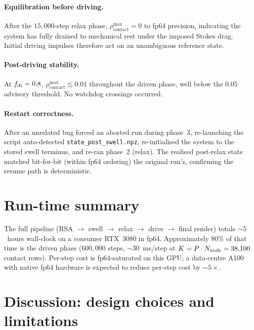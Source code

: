 \documentclass[aps,pre,twocolumn,floatfix,longbibliography]{revtex4-2}
\newcommand{\rhoc}{\rho_{\mathrm{contact}}}
\begin{document}
\paragraph*{Equilibration before driving.}
After the $15{,}000$-step relax phase, $\rhoc^{\max} = 0$ to fp64
precision, indicating the system has fully drained to mechanical rest
under the imposed Stokes drag.  Initial driving impulses therefore
act on an unambiguous reference state.

\paragraph*{Post-driving stability.}
At $f_{\rm dt} = 0.8$, $\rhoc^{\max} \lesssim 0.01$ throughout the
driven phase, well below the $0.05$ advisory threshold.  No
watchdog crossings occurred.

\paragraph*{Restart correctness.}
After an unrelated bug forced an aborted run during phase~3,
re-launching the script auto-detected
\texttt{state\_post\_swell.npz}, re-initialised the system to
the stored swell terminus, and re-ran phase~2 (relax).  The
realised post-relax state matched bit-for-bit (within fp64
ordering) the original run's, confirming the resume path is
deterministic.

\section{Run-time summary}

The full pipeline (RSA $\to$ swell $\to$ relax $\to$ drive $\to$
final render) totals $\sim 5$~hours wall-clock on a consumer
RTX~3080 in fp64.  Approximately $80\%$ of that time is the
driven phase ($600{,}000$ steps, $\sim 30$~ms/step at $K = P
\cdot N_{\rm node} = 38{,}100$ contact rows).  Per-step cost is
fp64-saturated on this GPU; a data-centre A100 with native fp64
hardware is expected to reduce per-step cost by $\sim 5\times$.

\section{Discussion: design choices and limitations}
\label{sec:discussion}
\end{document}
